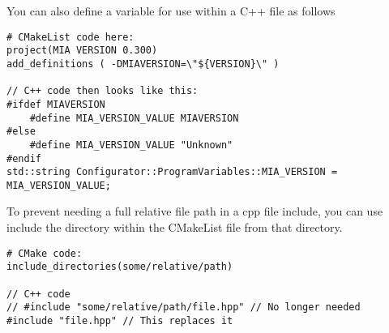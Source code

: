 You can also define a variable for use within a C++ file as follows
\begin{lstlisting}
# CMakeList code here:
project(MIA VERSION 0.300)
add_definitions ( -DMIAVERSION=\"${VERSION}\" )

// C++ code then looks like this:
#ifdef MIAVERSION
	#define MIA_VERSION_VALUE MIAVERSION
#else
	#define MIA_VERSION_VALUE "Unknown"
#endif
std::string Configurator::ProgramVariables::MIA_VERSION = MIA_VERSION_VALUE;
\end{lstlisting}

To prevent needing a full relative file path in a cpp file include, you can use include the directory within the CMakeList file from that directory.
\begin{lstlisting}
# CMake code:
include_directories(some/relative/path)

// C++ code
// #include "some/relative/path/file.hpp" // No longer needed
#include "file.hpp" // This replaces it
\end{lstlisting}